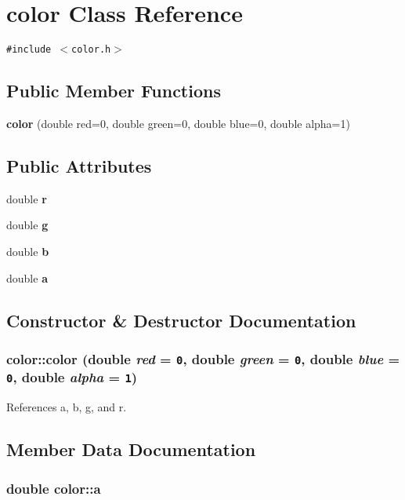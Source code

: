 \section{color Class Reference}
\label{classcolor}
{\tt \#include $<$color.h$>$}

\subsection*{Public Member Functions}
\begin{CompactItemize}
\item 
{\bf color} (double red=0, double green=0, double blue=0, double alpha=1)
\end{CompactItemize}
\subsection*{Public Attributes}
\begin{CompactItemize}
\item 
double {\bf r}
\item 
double {\bf g}
\item 
double {\bf b}
\item 
double {\bf a}
\end{CompactItemize}


\subsection{Constructor \& Destructor Documentation}
\subsubsection[{color}]{\setlength{\rightskip}{0pt plus 5cm}color::color (double {\em red} = {\tt 0}, \/  double {\em green} = {\tt 0}, \/  double {\em blue} = {\tt 0}, \/  double {\em alpha} = {\tt 1})\hspace{0.3cm}{\tt  [inline]}}\label{classcolor_ba3bed472445afce8e03332c4c37664b}




References a, b, g, and r.

\subsection{Member Data Documentation}
\subsubsection[{a}]{\setlength{\rightskip}{0pt plus 5cm}double {\bf color::a}}\label{classcolor_cb9c347f9efc0e4073272d5898a64124}




